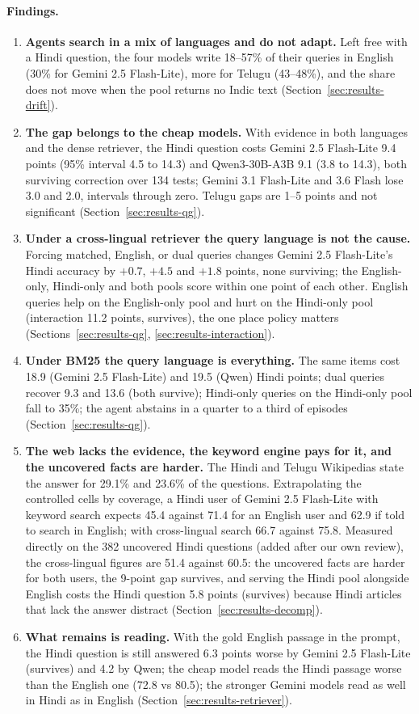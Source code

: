 \paragraph{Findings.}
\begin{enumerate}
\item \textbf{Agents search in a mix of languages and do not adapt.} Left free with a Hindi question, the four models write 18--57\% of their queries in English (30\% for Gemini 2.5 Flash-Lite), more for Telugu (43--48\%), and the share does not move when the pool returns no Indic text (Section~\ref{sec:results-drift}).
\item \textbf{The gap belongs to the cheap models.} With evidence in both languages and the dense retriever, the Hindi question costs Gemini 2.5 Flash-Lite 9.4 points (95\% interval 4.5 to 14.3) and Qwen3-30B-A3B 9.1 (3.8 to 14.3), both surviving correction over 134 tests; Gemini 3.1 Flash-Lite and 3.6 Flash lose 3.0 and 2.0, intervals through zero. Telugu gaps are 1--5 points and not significant (Section~\ref{sec:results-qg}).
\item \textbf{Under a cross-lingual retriever the query language is not the cause.} Forcing matched, English, or dual queries changes Gemini 2.5 Flash-Lite's Hindi accuracy by $+0.7$, $+4.5$ and $+1.8$ points, none surviving; the English-only, Hindi-only and both pools score within one point of each other. English queries help on the English-only pool and hurt on the Hindi-only pool (interaction 11.2 points, survives), the one place policy matters (Sections~\ref{sec:results-qg}, \ref{sec:results-interaction}).
\item \textbf{Under BM25 the query language is everything.} The same items cost 18.9 (Gemini 2.5 Flash-Lite) and 19.5 (Qwen) Hindi points; dual queries recover 9.3 and 13.6 (both survive); Hindi-only queries on the Hindi-only pool fall to 35\%; the agent abstains in a quarter to a third of episodes (Section~\ref{sec:results-qg}).
\item \textbf{The web lacks the evidence, the keyword engine pays for it, and the uncovered facts are harder.} The Hindi and Telugu Wikipedias state the answer for 29.1\% and 23.6\% of the questions. Extrapolating the controlled cells by coverage, a Hindi user of Gemini 2.5 Flash-Lite with keyword search expects 45.4 against 71.4 for an English user and 62.9 if told to search in English; with cross-lingual search 66.7 against 75.8. Measured directly on the 382 uncovered Hindi questions (added after our own review), the cross-lingual figures are 51.4 against 60.5: the uncovered facts are harder for both users, the 9-point gap survives, and serving the Hindi pool alongside English costs the Hindi question 5.8 points (survives) because Hindi articles that lack the answer distract (Section~\ref{sec:results-decomp}).
\item \textbf{What remains is reading.} With the gold English passage in the prompt, the Hindi question is still answered 6.3 points worse by Gemini 2.5 Flash-Lite (survives) and 4.2 by Qwen; the cheap model reads the Hindi passage worse than the English one (72.8 vs 80.5); the stronger Gemini models read as well in Hindi as in English (Section~\ref{sec:results-retriever}).
\end{enumerate}

